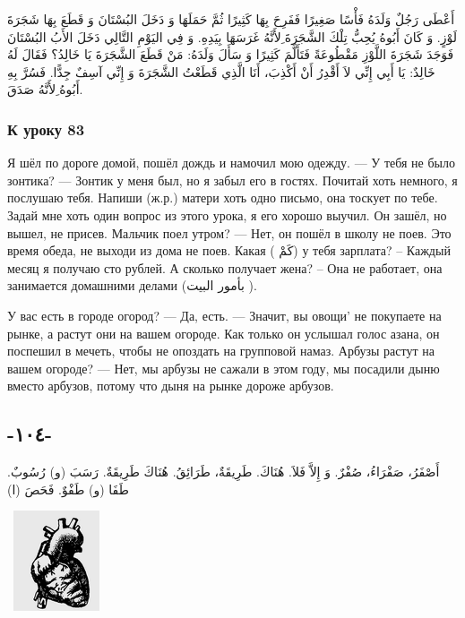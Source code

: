\documentclass[a5paper]{article}
\begin{document}
أَعْطَى رَجُلٌ وَلَدَهُ فَأْسًا صَغِيرًا فَفَرِحَ بِهَا كَثِيرًا ثُمَّ حَمَلَهَا وَ دَخَلَ البُسْتَانَ وَ قَطَعَ بِهَا شَجَرَةَ لَوْزٍ. وَ كَانَ أَبُوهُ يُحِبُّ تِلْكَ الشَّجَرَةَ ِلأَنَّهُ غَرَسَهَا بِيَدِهِ. وَ فِي اليَوْمِ التَّالِي دَخَلَ الأَبُ البُسْتَانَ فَوَجَدَ شَجَرَةَ اللَّوْزِ مَقْطُوعَةً فَتَأَلَّمَ كَثِيرًا وَ سَأَلَ وَلَدَهُ: مَنْ قَطَعَ الشَّجَرَةَ يَا خَالِدُ؟ فَقَالَ لَهُ خَالِدٌ: يَا أَبِي إِنِّي لاَ أَقْدِرُ أَنْ أَكْذِبَ، أَنَا الَّذِي قَطَعْتُ الشَّجَرَةَ وَ إِنِّي آسِفٌ جِدًّا. فَسُرَّ بِهِ أَبُوهُ ِلأَنَّهُ صَدَقَ.

\subsubsection{К уроку 83}
Я шёл по дороге домой, пошёл дождь и намочил мою одежду. — У тебя не было зонтика? — Зонтик у меня был, но я забыл его в гостях. Почитай хоть немного, я послушаю тебя. Напиши (ж.р.) матери хоть одно письмо, она тоскует по тебе. Задай мне хоть один вопрос из этого урока, я его хорошо выучил. Он зашёл, но вышел, не присев. Мальчик поел утром? — Нет, он пошёл в школу не поев. Это время обеда, не выходи из дома не поев. Какая ( كَمْ) у тебя зарплата? – Каждый месяц я получаю сто рублей. А сколько получает жена? – Она не работает, она занимается домашними делами (بأمور البيت ).

У вас есть в городе огород? — Да, есть. — Значит, вы овощи' не покупаете на рынке, а растут они на вашем огороде. Как только он услышал голос азана, он поспешил в мечеть, чтобы не опоздать на групповой намаз. Арбузы растут на вашем огороде? — Нет, мы арбузы не сажали в этом году, мы посадили дыню вместо арбузов, потому что дыня на рынке дороже арбузов.

\subsection[-١٠٤-]{-١٠٤-}
أَصْفَرُ، صَفْرَاءُ، صُفْرٌ. وَ إِلاَّ فَلاَ. هُنَاكَ. طَرِيقَةٌ، طَرَائِقُ. هُنَاكَ طَرِيقَةٌ. رَسَبَ (و) رُسُوبٌ. طَفَا (و) طَفْوٌ. فَحَصَ (ا) 

\  \includegraphics[width=1in,height=1.1665in]{MuhammadBagauddinlatinized-img277.png} 
\end{document}
